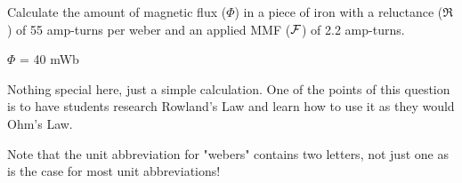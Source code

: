 

Calculate the amount of magnetic flux ($\Phi$) in a piece of iron with a reluctance ($\Re$) of 55 amp-turns per weber and an applied MMF ($\cal F$) of 2.2 amp-turns.







$\Phi$ = 40 mWb







Nothing special here, just a simple calculation.  One of the points of this question is to have students research Rowland's Law and learn how to use it as they would Ohm's Law.

Note that the unit abbreviation for "webers" contains two letters, not just one as is the case for most unit abbreviations!




